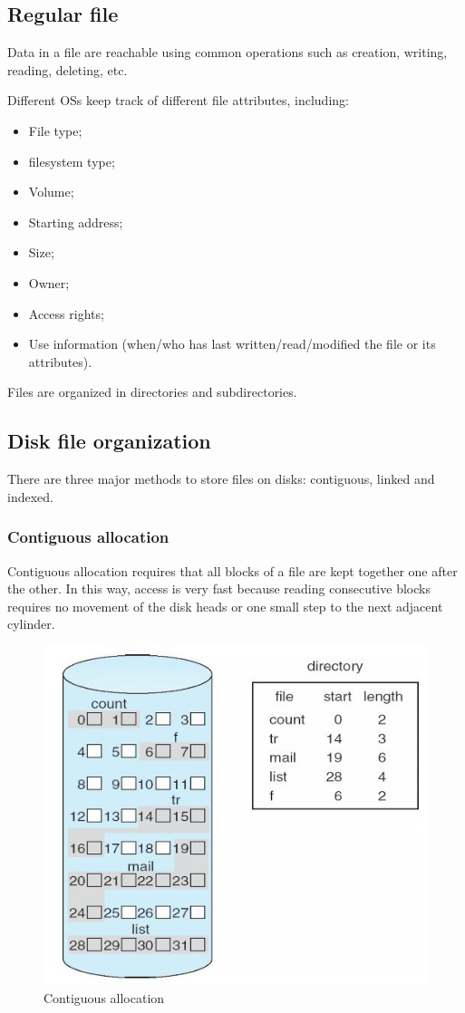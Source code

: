 \subsection{Regular file}
Data in a file are reachable using common operations such as creation, writing, reading, deleting, etc.

Different OSs keep track of different file attributes, including:
\begin{itemize}
\item File type;
\item filesystem type;
\item Volume;
\item Starting address;
\item Size;
\item Owner;
\item Access rights;
\item Use information (when/who has last written/read/modified the file or its attributes).
\end{itemize}
Files are organized in directories and subdirectories.

\subsection{Disk file organization}
There are three major methods to store files on disks: contiguous, linked and indexed.

\subsubsection{Contiguous allocation}
Contiguous allocation requires that all blocks of a file are kept together one after the other. In this way, access is very fast because reading consecutive blocks requires no movement of the disk heads or one small step to the next adjacent cylinder.

\begin{figure}[hbtp]
\centering
\includegraphics[scale=0.35]{images/file_system/contiguous_allocation.png}
\caption{Contiguous allocation}
\end{figure}

